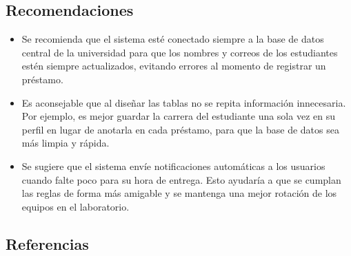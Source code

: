 \documentclass{article}
\begin{document}
\subsection{Recomendaciones}
\begin{itemize}
    \item Se recomienda que el sistema esté conectado siempre a la base de datos central de la universidad para que los nombres y correos de los estudiantes estén siempre actualizados, evitando errores al momento de registrar un préstamo.
    
    \item Es aconsejable que al diseñar las tablas no se repita información innecesaria. Por ejemplo, es mejor guardar la carrera del estudiante una sola vez en su perfil en lugar de anotarla en cada préstamo, para que la base de datos sea más limpia y rápida.
    
    \item Se sugiere que el sistema envíe notificaciones automáticas a los usuarios cuando falte poco para su hora de entrega. Esto ayudaría a que se cumplan las reglas de forma más amigable y se mantenga una mejor rotación de los equipos en el laboratorio.
\end{itemize}
\subsection{Referencias}
\vspace{-3em}
\renewcommand{\refname}{}
\nocite{*}



\vfill
\end{document}
